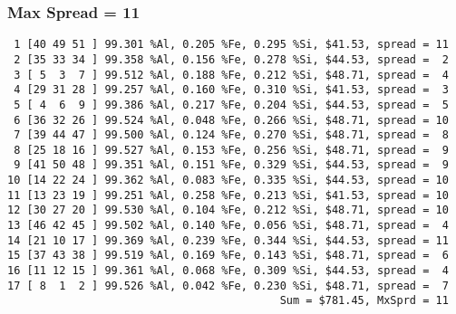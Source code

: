 \documentclass{article}
\begin{document}
\subsubsection{Max Spread = 11}
\begin{verbatim}
 1 [40 49 51 ] 99.301 %Al, 0.205 %Fe, 0.295 %Si, $41.53, spread = 11
 2 [35 33 34 ] 99.358 %Al, 0.156 %Fe, 0.278 %Si, $44.53, spread =  2
 3 [ 5  3  7 ] 99.512 %Al, 0.188 %Fe, 0.212 %Si, $48.71, spread =  4
 4 [29 31 28 ] 99.257 %Al, 0.160 %Fe, 0.310 %Si, $41.53, spread =  3
 5 [ 4  6  9 ] 99.386 %Al, 0.217 %Fe, 0.204 %Si, $44.53, spread =  5
 6 [36 32 26 ] 99.524 %Al, 0.048 %Fe, 0.266 %Si, $48.71, spread = 10
 7 [39 44 47 ] 99.500 %Al, 0.124 %Fe, 0.270 %Si, $48.71, spread =  8
 8 [25 18 16 ] 99.527 %Al, 0.153 %Fe, 0.256 %Si, $48.71, spread =  9
 9 [41 50 48 ] 99.351 %Al, 0.151 %Fe, 0.329 %Si, $44.53, spread =  9
10 [14 22 24 ] 99.362 %Al, 0.083 %Fe, 0.335 %Si, $44.53, spread = 10
11 [13 23 19 ] 99.251 %Al, 0.258 %Fe, 0.213 %Si, $41.53, spread = 10
12 [30 27 20 ] 99.530 %Al, 0.104 %Fe, 0.212 %Si, $48.71, spread = 10
13 [46 42 45 ] 99.502 %Al, 0.140 %Fe, 0.056 %Si, $48.71, spread =  4
14 [21 10 17 ] 99.369 %Al, 0.239 %Fe, 0.344 %Si, $44.53, spread = 11
15 [37 43 38 ] 99.519 %Al, 0.169 %Fe, 0.143 %Si, $48.71, spread =  6
16 [11 12 15 ] 99.361 %Al, 0.068 %Fe, 0.309 %Si, $44.53, spread =  4
17 [ 8  1  2 ] 99.526 %Al, 0.042 %Fe, 0.230 %Si, $48.71, spread =  7
                                          Sum = $781.45, MxSprd = 11
\end{verbatim}
\end{document}
